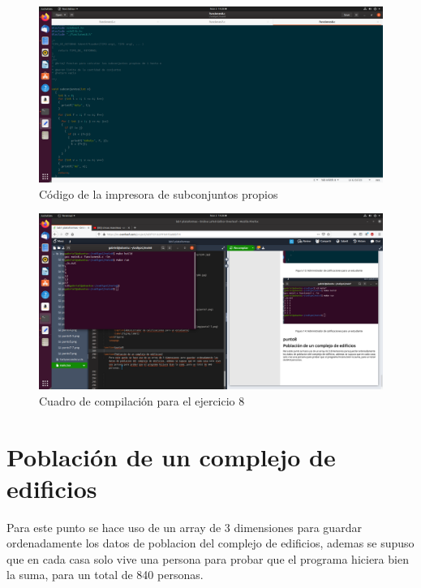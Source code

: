 \documentclass[
  letterpaper, 
  maincolor=black,
  sectioncolor=black!90,
  subsectioncolor=black!70,
  itemtextcolor=black!40,
]{fortysecondscv}
\begin{document}
        \begin{figure}[H]
            \centering
            \includegraphics[trim= 50 10 800 90,clip,width=1.20\textwidth]{img/punto8.png}
            \caption{Código de la impresora de subconjuntos propios}
            \label{fig:my_label}
        \end{figure}
        \begin{figure}[H]
            \centering
            \includegraphics[trim= 125 500 980 150,clip,width=1.20\textwidth]{img/punto8-8.png}
            \caption{Cuadro de compilación para el ejercicio 8}
            \label{fig:my_label}
        \end{figure}
    \newpage
    \section{Población de un complejo de edificios}
        Para este punto se hace uso de un array de 3 dimensiones para guardar ordenadamente los datos de poblacion del complejo de edificios, ademas se supuso que en cada casa solo vive una persona para probar que el programa hiciera bien la suma, para un total de 840 personas. 
        
\end{document}
